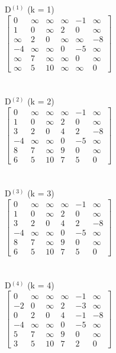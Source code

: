 \documentclass[11pt]{article}
\begin{document}
\vspace*{3ex}D$^{(1)}$ (k = 1)\\
$\begin{bmatrix}
0 & \infty & \infty & \infty & -1 & \infty\\
1 & 0 & \infty & 2 & 0 & \infty\\
\infty & 2 & 0 & \infty & \infty & -8\\
-4 & \infty & \infty & 0 & -5 & \infty\\
\infty & 7 & \infty & \infty & 0 & \infty\\
\infty & 5 & 10 & \infty & \infty & 0
\end{bmatrix}$\\\\\\
\vspace*{3ex}D$^{(2)}$ (k = 2)\\
$\begin{bmatrix}
0 & \infty & \infty & \infty & -1 & \infty\\
1 & 0 & \infty & 2 & 0 & \infty\\
3 & 2 & 0 & 4 & 2 & -8\\
-4 & \infty & \infty & 0 & -5 & \infty\\
8 & 7 & \infty & 9 & 0 & \infty\\
6 & 5 & 10 & 7 & 5 & 0
\end{bmatrix}$\\\\\\
\vspace*{3ex}D$^{(3)}$ (k = 3)\\
$\begin{bmatrix}
0 & \infty & \infty & \infty & -1 & \infty\\
1 & 0 & \infty & 2 & 0 & \infty\\
3 & 2 & 0 & 4 & 2 & -8\\
-4 & \infty & \infty & 0 & -5 & \infty\\
8 & 7 & \infty & 9 & 0 & \infty\\
6 & 5 & 10 & 7 & 5 & 0
\end{bmatrix}$\\\\\\
\vspace*{3ex}D$^{(4)}$ (k = 4)\\
$\begin{bmatrix}
0 & \infty & \infty & \infty & -1 & \infty\\
-2 & 0 & \infty & 2 & -3 & \infty\\
0 & 2 & 0 & 4 & -1 & -8\\
-4 & \infty & \infty & 0 & -5 & \infty\\
5 & 7 & \infty & 9 & 0 & \infty\\
3 & 5 & 10 & 7 & 2 & 0
\end{bmatrix}$\\\\\\
\end{document}
